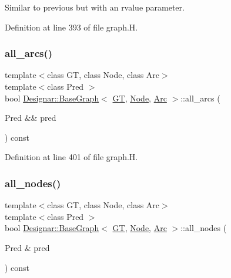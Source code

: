 Similar to previous but with an rvalue parameter. 



Definition at line 393 of file graph.\+H.

\mbox{\label{class_designar_1_1_base_graph_aea71a873faf7e92195d582b21d14c347}} 
\subsubsection{\texorpdfstring{all\+\_\+arcs()}{all\_arcs()}\hspace{0.1cm}{\footnotesize\ttfamily [2/2]}}
{\footnotesize\ttfamily template$<$class GT, class Node, class Arc$>$ \\
template$<$class Pred $>$ \\
bool \hyperlink{class_designar_1_1_base_graph}{Designar\+::\+Base\+Graph}$<$ \hyperlink{demo-buildgraph_8_c_a3001c40d2c31ca87ed96cd7d1334a55e}{GT}, \hyperlink{namespace_designar_a5af326c65aa2bd26b26c410f2030d09e}{Node}, \hyperlink{namespace_designar_a3f55fb5513d62ff47cbc8f72b8e95d6f}{Arc} $>$\+::all\+\_\+arcs (\begin{DoxyParamCaption}\item[{Pred \&\&}]{pred }\end{DoxyParamCaption}) const\hspace{0.3cm}{\ttfamily [inline]}}



Definition at line 401 of file graph.\+H.

\mbox{\label{class_designar_1_1_base_graph_abad9513273c1096aba652e211180061c}} 
\subsubsection{\texorpdfstring{all\+\_\+nodes()}{all\_nodes()}\hspace{0.1cm}{\footnotesize\ttfamily [1/2]}}
{\footnotesize\ttfamily template$<$class GT, class Node, class Arc$>$ \\
template$<$class Pred $>$ \\
bool \hyperlink{class_designar_1_1_base_graph}{Designar\+::\+Base\+Graph}$<$ \hyperlink{demo-buildgraph_8_c_a3001c40d2c31ca87ed96cd7d1334a55e}{GT}, \hyperlink{namespace_designar_a5af326c65aa2bd26b26c410f2030d09e}{Node}, \hyperlink{namespace_designar_a3f55fb5513d62ff47cbc8f72b8e95d6f}{Arc} $>$\+::all\+\_\+nodes (\begin{DoxyParamCaption}\item[{Pred \&}]{pred }\end{DoxyParamCaption}) const\hspace{0.3cm}{\ttfamily [inline]}}



